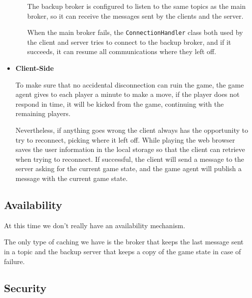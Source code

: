\documentclass{scrartcl}
\begin{document}
\begin{itemize}
\begin{itemize}
                        The backup broker is configured to listen to the same topics as the
                        main broker, so it can receive the messages sent by the clients and the server.

                        When the main broker fails, the \texttt{ConnectionHandler} class both used
                        by the client and server tries to connect to the backup broker,
                        and if it succeeds, it can resume all communications where they left off.
            \end{itemize}
      \item
            \textbf{Client-Side} \par
            To make sure that no accidental disconnection can ruin the game, the game agent gives to
            each player a minute to make a move, if the player does not respond in time, it will be
            kicked from the game, continuing with the remaining players.

            Nevertheless, if anything goes wrong the client always has the opportunity to try to
            reconnect, picking where it left off. While playing the web browser saves the user
            information in the local storage so that the client can retrieve when trying to reconnect.
            If successful, the client will send a message to the server asking for the current game
            state, and the game agent will publish a message with the current game state.
\end{itemize}

\subsection{Availability}\label{availability}

At this time we don't really have an availability mechanism.

The only type of caching we have is the broker that keeps the last message sent in a topic
and the backup server that keeps a copy of the game state in case of failure.

\subsection{Security}\label{security}
\end{document}
